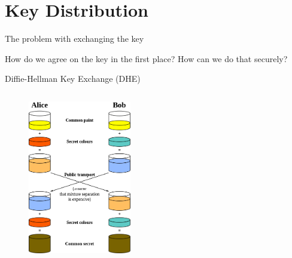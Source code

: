 \documentclass{beamer}
\begin{document}
	\section{Key Distribution}
	\begin{frame}{The problem with exchanging the key} %

		How do we agree on the key in the first place? How can we do that securely?\linebreak


		\begin{enumerate}

		\end{enumerate}


	\end{frame}

	\begin{frame}{Diffie-Hellman Key Exchange (DHE)} %
		\begin{columns}
			\begin{column}{\textwidth}
				\begin{figure}
					\includegraphics[width=0.4\textwidth]{images/diffie-hellman}
				\end{figure}
			\end{column}
		\end{columns}
	\end{frame}
\end{document}
